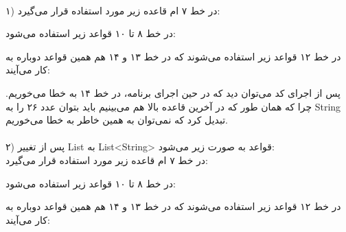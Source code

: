\\
۱) در خط ۷ ام قاعده زیر مورد استفاده قرار می‌گیرد:
\begin{prooftree}
\end{prooftree}
در خط ۸ تا ۱۰ قواعد زیر استفاده می‌شود:
\begin{prooftree}
\end{prooftree}
\begin{prooftree}
\end{prooftree}
در خط ۱۲ قواعد زیر استفاده می‌شوند که در خط ۱۳ و ۱۴ هم همین قواعد دوباره به کار می‌آیند:
\begin{prooftree}
\end{prooftree}
\begin{prooftree}
\end{prooftree}
\begin{prooftree}
\end{prooftree}
پس از اجرای کد می‌توان دید که در حین اجرای برنامه، در خط ۱۴ به خطا می‌خوریم. چرا که همان طور که در آخرین قاعده بالا هم می‌بینیم باید بتوان عدد ۲۶ را به String تبدیل کرد که نمی‌توان به همین خاطر به خطا می‌خوریم.
\\
\\
۲) پس از تغییر List به List<String> قواعد به صورت زیر می‌شود:
\\
در خط ۷ ام قاعده زیر مورد استفاده قرار می‌گیرد:
\begin{prooftree}
\end{prooftree}
در خط ۸ تا ۱۰ قواعد زیر استفاده می‌شود:
\begin{prooftree}
\end{prooftree}
\begin{prooftree}
\end{prooftree}
در خط ۱۲ قواعد زیر استفاده می‌شوند که در خط ۱۳ و ۱۴ هم همین قواعد دوباره به کار می‌آیند:
\begin{prooftree}
\end{prooftree}
